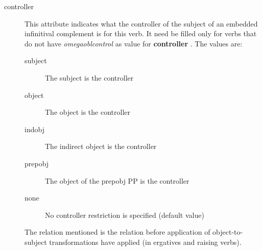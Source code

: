 \begin{description}
\item[controller] This attribute indicates what the controller of the subject
of an embedded infinitival complement is for this verb. It need be filled only 
for verbs that do not have {\em omegaoblcontrol\/} as value for {\bf controller
}. The values are:
   \begin{description}
   \item[subject] The subject is the controller
   \item[object] The object is the controller
   \item[indobj] The indirect object is the controller
   \item[prepobj] The object of the prepobj PP is the controller
   \item[none] No controller restriction is specified (default value)
   \end{description}
The relation mentioned is the relation before application of object-to-subject
transformations have applied (in ergatives and raising verbs).


\end{description}
